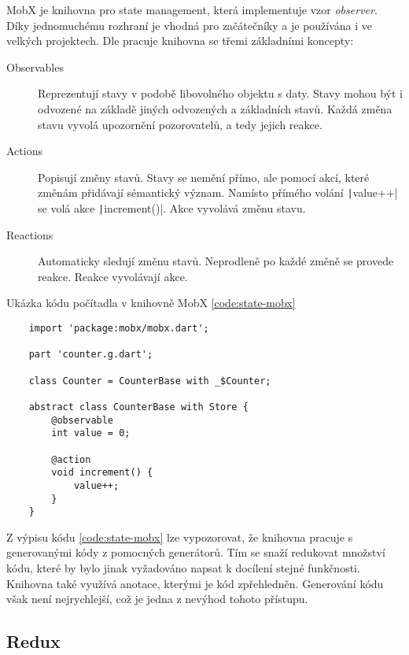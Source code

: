 MobX je knihovna pro state management,
která implementuje vzor \emph{observer}.
Díky jednomuchému rozhraní je vhodná pro začátečníky
a je používána i ve velkých projektech.
Dle \cite{mobx_core_concepts} pracuje knihovna se třemi základními koncepty:

\begin{description}
    \item[Observables] Reprezentují stavy v podobě libovolného objektu s daty.
    Stavy mohou být i odvozené na základě jiných odvozených a základních stavů.
    Každá změna stavu vyvolá upozornění pozorovatelů, a tedy jejich reakce.
    \item[Actions] Popisují změny stavů.
    Stavy se nemění přímo,
    ale pomocí akcí,
    které změnám přidávají sémantický význam.
    Namísto přímého volání \texttt|value++| se volá akce
    \texttt|increment()|.
    Akce vyvolává změnu stavu.
    \item[Reactions] Automaticky sledují změnu stavů.
    Neprodleně po každé změně se provede reakce.
    Reakce vyvolávají akce.
\end{description}

\begin{listing}
    \caption{Ukázka kódu počítadla v knihovně MobX \ref{code:state-mobx}}
    \label{code:state-mobx}
    \begin{verbatim}
    import 'package:mobx/mobx.dart';

    part 'counter.g.dart';
    
    class Counter = CounterBase with _$Counter;
    
    abstract class CounterBase with Store {
        @observable
        int value = 0;
    
        @action
        void increment() {
            value++;
        }
    }
    \end{verbatim}
\end{listing}

Z výpisu kódu \ref{code:state-mobx} lze vypozorovat,
že knihovna pracuje s generovanými kódy z pomocných generátorů.
Tím se snaží redukovat množství kódu,
které by bylo jinak vyžadováno napsat k docílení stejné funkčnosti.
Knihovna také využívá anotace,
kterými je kód zpřehledněn.
Generování kódu však není nejrychlejší,
což je jedna z nevýhod tohoto přístupu.

\subsection{Redux}


